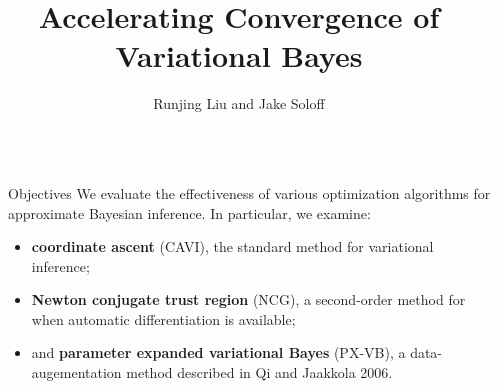 \documentclass[final]{beamer}
\title{Accelerating Convergence of Variational Bayes} %
\author{Runjing Liu and Jake Soloff} %
\institute{Department of Statistics, UC Berkeley} %
\newlength{\sepwid}
\newlength{\onecolwid}
\begin{document}

\setlength{\belowcaptionskip}{2ex} %
\setlength\belowdisplayshortskip{2ex} %

\begin{frame}[t] %

\begin{columns}[t] %

\begin{column}{\sepwid}\end{column} %

\begin{column}{\onecolwid} %


\begin{alertblock}{Objectives}
We evaluate the effectiveness of various optimization algorithms for approximate Bayesian inference. In particular, we examine: \vspace{-.5em}
\begin{itemize}
\item {\bf coordinate ascent} (CAVI), the standard method for variational inference;
\item {\bf Newton conjugate trust region} (NCG), a second-order method for when automatic differentiation is available; 
\item and {\bf parameter expanded variational Bayes} (PX-VB), a data-augementation method described in Qi and Jaakkola 2006. 
\end{itemize}


\end{alertblock}



\end{column}
\end{columns}
\end{frame}
\end{document}
